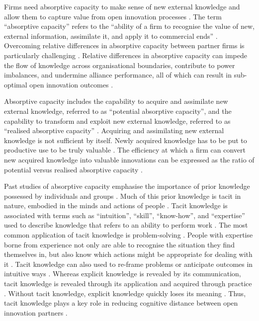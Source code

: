 Firms need absorptive capacity to make sense of new external knowledge and allow them to capture value from open innovation processes \citep{vanhaverbeke2007connecting,zobel2016benefiting}. The term \enquote{absorptive capacity} refers to the \enquote{ability of a firm to recognise the value of new, external information, assimilate it, and apply it to commercial ends} \citep{cohen1990absorptive}. Overcoming relative differences in absorptive capacity between partner firms is particularly challenging \citep{zobel2016benefiting}. Relative differences in absorptive capacity can impede the flow of knowledge across organisational boundaries, contribute to power imbalances, and undermine alliance performance, all of which can result in sub-optimal open innovation outcomes \citep{lane1998relative,vanhaverbeke2007connecting}.  \medskip

Absorptive capacity includes the capability to acquire and assimilate new external knowledge, referred to as \enquote{potential absorptive capacity}, and the capability to transform and exploit new external knowledge, referred to as \enquote{realised absorptive capacity} \citep{zahra2002absorptive}. Acquiring and assimilating new external knowledge is not sufficient by itself. Newly acquired knowledge has to be put to productive use to be truly valuable \citep{zobel2016benefiting}. The efficiency at which a firm can convert new acquired knowledge into valuable innovations can be expressed as the ratio of potential versus realised absorptive capacity \citep{zahra2002absorptive}. \medskip

Past studies of absorptive capacity emphasise the importance of prior knowledge possessed by individuals and groups \citep[e.g.][]{cohen1990absorptive,todorova2007absorptive,lichtenthaler2009absorptive}. Much of this prior knowledge is tacit in nature, embodied in the minds and actions of people \citep{lichtenthaler2016absorptive}. Tacit knowledge is associated with terms such as \enquote{intuition}, \enquote{skill}, \enquote{know-how}, and \enquote{expertise} used to describe knowledge that refers to an ability to perform work \citep{horvath2000working,mcadam2007exploring}. The most common application of tacit knowledge is problem-solving \citep{leonard1998role}. People with expertise borne from experience not only are able to recognise the situation they find themselves in, but also know which actions might be appropriate for dealing with it \citep{simon1971human}. Tacit knowledge can also used to re-frame problems or anticipate outcomes in intuitive ways \citep{leonard1998role}. Whereas explicit knowledge is revealed by its communication, tacit knowledge is revealed through its application and acquired through practice \citep{grant1996toward}. Without tacit knowledge, explicit knowledge quickly loses its meaning \citep{nonaka1994dynamic,seidler2008use}. Thus, tacit knowledge plays a key role in reducing cognitive distance between open innovation partners \citep{nooteboom2007optimal,goffin2010managing,szulanski2016overcoming}.  \medskip 
 
